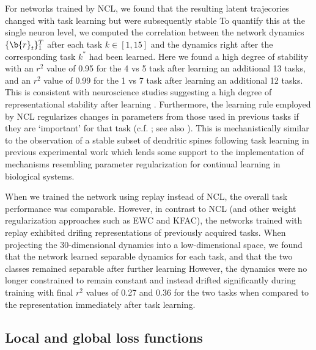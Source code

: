 For networks trained by NCL, we found that the resulting latent trajecories changed with task learning but were subsequently stable %
To quantify this at the single neuron level, we computed the correlation between the network dynamics $\{ \b{r}_t \}_1^T$ after each task $k \in [1, 15]$ and the dynamics right after the corresponding task $k^*$ had been learned.
Here we found a high degree of stability with an $r^2$ value of 0.95 for the 4 vs 5 task after learning an additional 13 tasks, and an $r^2$ value of 0.99 for the 1 vs 7 task after learning an additional 12 tasks.
This is consistent with neuroscience studies suggesting a high degree of representational stability after learning \citep{dhawale2017automated,chestek2007single,flint2016long,katlowitz2018stable}.
Furthermore, the learning rule employed by NCL regularizes changes in parameters from those used in previous tasks if they are `important' for that task (c.f. ; see also \citealp{kirkpatrick2017overcoming}).
This is mechanistically similar to the observation of a stable subset of dendritic spines following task learning in previous experimental work \citep{yang2009stably,fu2012repetitive} which lends some support to the implementation of mechanisms resembling parameter regularization for continual learning in biological systems.

When we trained the network using replay instead of NCL, the overall task performance was comparable.
However, in contrast to NCL (and other weight regularization approaches such as EWC and KFAC), the networks trained with replay exhibited drifing representations of previously acquired tasks.
When projecting the 30-dimensional dynamics into a low-dimensional space, we found that the network learned separable dynamics for each task, and that the two classes remained separable after further learning %
However, the dynamics were no longer constrained to remain constant and instead drifted significantly during training with final $r^2$ values of 0.27 and 0.36 for the two tasks when compared to the representation immediately after task learning.

\subsection*{Local and global loss functions}

